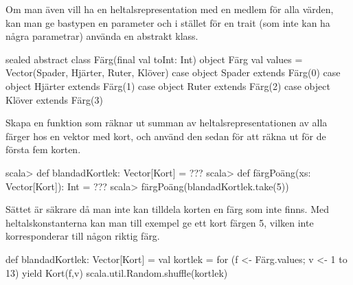 


\Subtask Om man även vill ha en heltalsrepresentation med en medlem  för alla värden, kan man ge bastypen en parameter och i stället för en trait (som inte kan ha några parametrar) använda en abstrakt klass.

\begin{Code}
sealed abstract class Färg(final val toInt: Int)
object Färg {
  val values = Vector(Spader, Hjärter, Ruter, Klöver)
}
case object Spader  extends Färg(0)
case object Hjärter extends Färg(1)
case object Ruter   extends Färg(2)
case object Klöver  extends Färg(3)
\end{Code}
Skapa en funktion  som räknar ut summan av heltalsrepresentationen av alla färger hos en vektor med kort, och använd den sedan för att räkna ut  för de första fem korten.
\begin{REPL}
scala> def blandadKortlek: Vector[Kort] = ???
scala> def färgPoäng(xs: Vector[Kort]): Int = ???
scala> färgPoäng(blandadKortlek.take(5))
\end{REPL}


\SOLUTION

\TaskSolved \what

\SubtaskSolved  Sättet är säkrare då man inte kan tilldela korten en färg som inte finns. Med heltalskonstanterna kan man till exempel ge ett kort färgen 5, vilken inte korresponderar till någon riktig färg.

\SubtaskSolved  {}

\SubtaskSolved
\begin{Code}
def blandadKortlek: Vector[Kort] = {
  val kortlek =
    for (f <- Färg.values; v <- 1 to 13) yield Kort(f,v)
  scala.util.Random.shuffle(kortlek)
}
\end{Code}

\SubtaskSolved  {}

\QUESTEND












\ExtraTasks %





